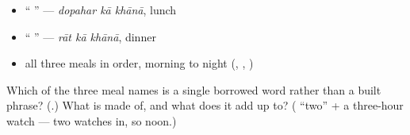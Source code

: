 \begin{itemize}
\raggedright
  \item \textquotedblleft{}  \textquotedblright{} — \emph{dopahar kā khānā}, lunch
  \item \textquotedblleft{}  \textquotedblright{} — \emph{rāt kā khānā}, dinner
  \item all three meals in order, morning to night (,   ,   )
\end{itemize}

\begin{tcolorbox}[breakable,colback=teal!4,colframe=teal!35!black,title={Before you move on}]
Which of the three meal names is a single borrowed word rather than a built phrase? (\textbf{}.) What is  made of, and what does it add up to? (\textbf{} \textquotedblleft{}two\textquotedblright{} + \textbf{} a three-hour watch — two watches in, so noon.)
\end{tcolorbox}
